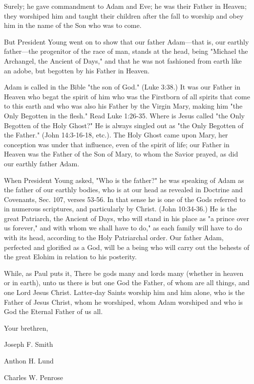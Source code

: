 Surely; he gave commandment to Adam and Eve; he was their Father in Heaven; they
worshiped him and taught their children after the fall to worship and obey him in the name of
the Son who was to come.

But President Young went on to show that our father Adam—that is, our earthly father—the
progenitor of the race of man, stands at the head, being "Michael the Archangel, the Ancient
of Days," and that he was not fashioned from earth like an adobe, but begotten by his Father
in Heaven.

Adam is called in the Bible "the son of God." (Luke 3:38.) It was our Father in Heaven who
begat the spirit of him who was the Firstborn of all spirits that come to this earth and who
was also his Father by the Virgin Mary, making him "the Only Begotten in the flesh." Read
Luke 1:26-35. Where is Jesus called "the Only Begotten of the Holy Ghost?" He is always
singled out as "the Only Begotten of the Father." (John 14:3-16-18, etc.). The Holy Ghost
came upon Mary, her conception was under that influence, even of the spirit of life; our
Father in Heaven was the Father of the Son of Mary, to whom the Savior prayed, as did our
earthly father Adam.

When President Young asked, "Who is the father?" he was speaking of Adam as the father of
our earthly bodies, who is at our head as revealed in Doctrine and Covenants, Sec. 107,
verses 53-56. In that sense he is one of the Gods referred to in numerous scriptures, and
particularly by Christ. (John 10:34-36.) He is the great Patriarch, the Ancient of Days, who
will stand in his place as "a prince over us forever," and with whom we shall have to do," as
each family will have to do with its head, according to the Holy Patriarchal order. Our father
Adam, perfected and glorified as a God, will be a being who will carry out the behests of the
great Elohim in relation to his posterity.

While, as Paul puts it, There be gods many and lords many (whether in heaven or in earth),
unto us there is but one God the Father, of whom are all things, and one Lord Jesus Christ.
Latter-day Saints worship him and him alone, who is the Father of Jesus Christ, whom he
worshiped, whom Adam worshiped and who is God the Eternal Father of us all.

Your brethren,

Joseph F. Smith

Anthon H. Lund

Charles W. Penrose

